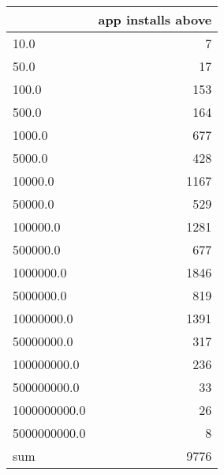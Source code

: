 \begin{tabular}{lr}
\toprule
{} &  app installs above \\
\midrule
10.0         &  7 \\
50.0         &  17 \\
100.0        &  153 \\
500.0        &  164 \\
1000.0       &  677 \\
5000.0       &  428 \\
10000.0      &  1167 \\
50000.0      &  529 \\
100000.0     &  1281 \\
500000.0     &  677 \\
1000000.0    &  1846 \\
5000000.0    &  819 \\
10000000.0   &  1391 \\
50000000.0   &  317 \\
100000000.0  &  236 \\
500000000.0  &  33 \\
1000000000.0 &  26 \\
5000000000.0 &  8 \\
sum          &  9776 \\
\bottomrule
\end{tabular}
